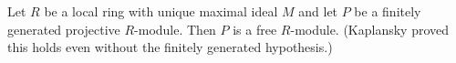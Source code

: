 Let $R$ be a local ring with unique maximal ideal $M$ and let $P$ be a finitely generated projective $R$-module. Then $P$ is a free $R$-module. (Kaplansky proved this holds even without the finitely generated hypothesis.)
